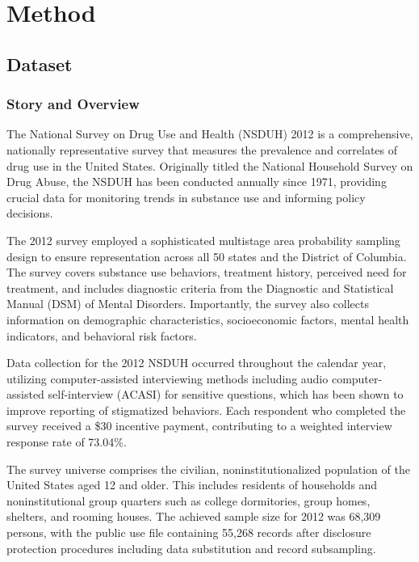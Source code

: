 \documentclass[conference]{IEEEtran}
\begin{document}
\section{Method}

\subsection{Dataset}

\subsubsection{Story and Overview}

The National Survey on Drug Use and Health (NSDUH) 2012 is a comprehensive, nationally representative survey that measures the prevalence and correlates of drug use in the United States. Originally titled the National Household Survey on Drug Abuse, the NSDUH has been conducted annually since 1971, providing crucial data for monitoring trends in substance use and informing policy decisions.

The 2012 survey employed a sophisticated multistage area probability sampling design to ensure representation across all 50 states and the District of Columbia. The survey covers substance use behaviors, treatment history, perceived need for treatment, and includes diagnostic criteria from the Diagnostic and Statistical Manual (DSM) of Mental Disorders. Importantly, the survey also collects information on demographic characteristics, socioeconomic factors, mental health indicators, and behavioral risk factors.

Data collection for the 2012 NSDUH occurred throughout the calendar year, utilizing computer-assisted interviewing methods including audio computer-assisted self-interview (ACASI) for sensitive questions, which has been shown to improve reporting of stigmatized behaviors. Each respondent who completed the survey received a \$30 incentive payment, contributing to a weighted interview response rate of 73.04\%.

The survey universe comprises the civilian, noninstitutionalized population of the United States aged 12 and older. This includes residents of households and noninstitutional group quarters such as college dormitories, group homes, shelters, and rooming houses. The achieved sample size for 2012 was 68,309 persons, with the public use file containing 55,268 records after disclosure protection procedures including data substitution and record subsampling.
\end{document}
